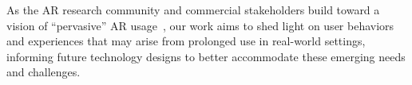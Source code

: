 As the AR research community and commercial stakeholders build toward a vision of ``pervasive'' AR usage~\cite{grubert2017pervasive}, our work aims to shed light on user behaviors and experiences that may arise from prolonged use in real-world settings, informing future technology designs to better accommodate these emerging needs and challenges.
